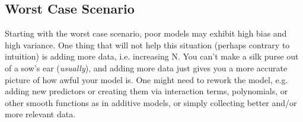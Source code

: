 \documentclass[english,nohyper,titlepage]{tufte-handout}
\begin{document}
\subsection{Worst Case Scenario}
Starting with the worst case scenario, poor models may exhibit high bias and high variance.  One thing that will not help this situation (perhaps contrary to intuition) is adding more data, i.e. increasing N.  You can't make a silk purse out of a sow's ear (\emph{usually}), and adding more data just gives you a more accurate picture of how awful your model is. One might need to rework the model, e.g. adding new predictors or creating them via interaction terms, polynomials, or other smooth functions as in additive models, or simply collecting better and/or more relevant data.
\end{document}

